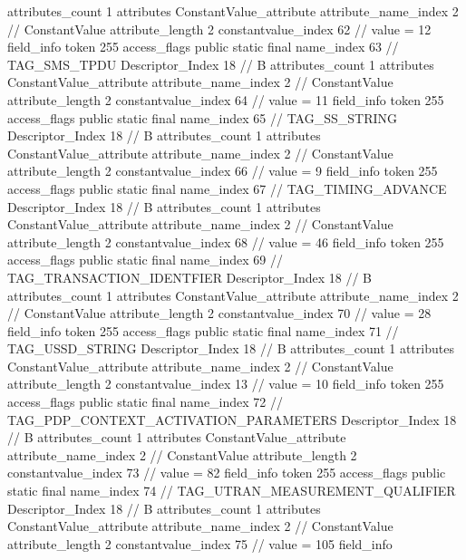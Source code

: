 {{{{{				attributes_count	1
				attributes {
				ConstantValue_attribute {
					attribute_name_index	2		// ConstantValue
					attribute_length	2
					constantvalue_index	62		// value = 12
				}
				}
			}
			field_info {
				token	255
				access_flags	public static final
				name_index	63		// TAG_SMS_TPDU
				Descriptor_Index	18		// B
				attributes_count	1
				attributes {
				ConstantValue_attribute {
					attribute_name_index	2		// ConstantValue
					attribute_length	2
					constantvalue_index	64		// value = 11
				}
				}
			}
			field_info {
				token	255
				access_flags	public static final
				name_index	65		// TAG_SS_STRING
				Descriptor_Index	18		// B
				attributes_count	1
				attributes {
				ConstantValue_attribute {
					attribute_name_index	2		// ConstantValue
					attribute_length	2
					constantvalue_index	66		// value = 9
				}
				}
			}
			field_info {
				token	255
				access_flags	public static final
				name_index	67		// TAG_TIMING_ADVANCE
				Descriptor_Index	18		// B
				attributes_count	1
				attributes {
				ConstantValue_attribute {
					attribute_name_index	2		// ConstantValue
					attribute_length	2
					constantvalue_index	68		// value = 46
				}
				}
			}
			field_info {
				token	255
				access_flags	public static final
				name_index	69		// TAG_TRANSACTION_IDENTFIER
				Descriptor_Index	18		// B
				attributes_count	1
				attributes {
				ConstantValue_attribute {
					attribute_name_index	2		// ConstantValue
					attribute_length	2
					constantvalue_index	70		// value = 28
				}
				}
			}
			field_info {
				token	255
				access_flags	public static final
				name_index	71		// TAG_USSD_STRING
				Descriptor_Index	18		// B
				attributes_count	1
				attributes {
				ConstantValue_attribute {
					attribute_name_index	2		// ConstantValue
					attribute_length	2
					constantvalue_index	13		// value = 10
				}
				}
			}
			field_info {
				token	255
				access_flags	public static final
				name_index	72		// TAG_PDP_CONTEXT_ACTIVATION_PARAMETERS
				Descriptor_Index	18		// B
				attributes_count	1
				attributes {
				ConstantValue_attribute {
					attribute_name_index	2		// ConstantValue
					attribute_length	2
					constantvalue_index	73		// value = 82
				}
				}
			}
			field_info {
				token	255
				access_flags	public static final
				name_index	74		// TAG_UTRAN_MEASUREMENT_QUALIFIER
				Descriptor_Index	18		// B
				attributes_count	1
				attributes {
				ConstantValue_attribute {
					attribute_name_index	2		// ConstantValue
					attribute_length	2
					constantvalue_index	75		// value = 105
				}
				}
			}
			field_info {
}}}}}
